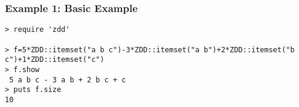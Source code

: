 \subsubsection*{Example 1: Basic Example}



\begin{Verbatim}[baselinestretch=0.7,frame=single]
> require 'zdd'

> f=5*ZDD::itemset("a b c")-3*ZDD::itemset("a b")+2*ZDD::itemset("b c")+1*ZDD::itemset("c")
> f.show
 5 a b c - 3 a b + 2 b c + c
> puts f.size
10
\end{Verbatim}

